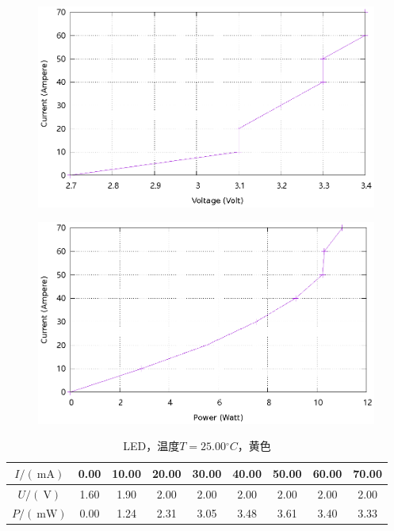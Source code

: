 \documentclass{ctexart}
\newcommand{\si}[1]{\  \mathrm{#1}}
\begin{document}
\begin{figure}[H]
    \centering
    \includegraphics[width=0.9\linewidth]{../output/led-vc-2.gnuplot}
\end{figure}
\begin{figure}[H]
    \centering
    \includegraphics[width=0.9\linewidth]{../output/led-pc-2.gnuplot}
\end{figure}
\newpage
\begin{table}[H]
    \centering
    \begin{tabular}{|c|c|c|c|c|c|c|c|c|}
        \hline
        $I/(\si{mA})$   & 0.00 & 10.00 & 20.00 & 30.00 & 40.00 & 50.00 & 60.00 & 70.00 \\\hline
        $U / (\si{V})$  & 1.60 & 1.90 & 2.00 & 2.00 & 2.00 & 2.00 & 2.00 & 2.00 \\\hline
        $P / (\si{mW})$ & 0.00 & 1.24 & 2.31 & 3.05 & 3.48 & 3.61 & 3.40 & 3.33 \\\hline
    \end{tabular}
    \caption{LED，温度$T=25.00{}^{\circ}C$，黄色}
\end{table}
\end{document}
